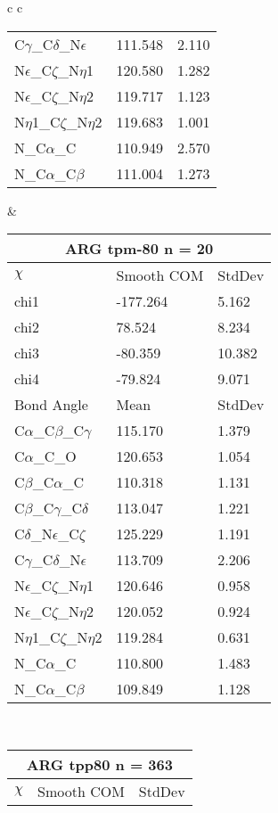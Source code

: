 \begin{longtable}{ c c }
\begin{tabular}{ l l l }
  C$\gamma$\_C$\delta$\_N$\epsilon$ & 111.548 & 2.110\\
  N$\epsilon$\_C$\zeta$\_N$\eta$1 & 120.580 & 1.282\\
  N$\epsilon$\_C$\zeta$\_N$\eta$2 & 119.717 & 1.123\\
  N$\eta$1\_C$\zeta$\_N$\eta$2 & 119.683 & 1.001\\
  N\_C$\alpha$\_C & 110.949 & 2.570\\
  N\_C$\alpha$\_C$\beta$ & 111.004 & 1.273\\
  \bottomrule
  \end{tabular}
  &
  \begin{tabular}{ l l l }
  \toprule
  \multicolumn{3}{c}{ARG \textbf{tpm-80} n = 20} \\ \toprule
  $\chi$       & Smooth COM & StdDev \\ \midrule
  chi1 & -177.264 & 5.162 \\ 
  chi2 & 78.524 & 8.234 \\ 
  chi3 & -80.359 & 10.382 \\ 
  chi4 & -79.824 & 9.071 \\ \midrule
  Bond Angle   & Mean     & StdDev \\ \midrule
  C$\alpha$\_C$\beta$\_C$\gamma$ & 115.170 & 1.379\\
  C$\alpha$\_C\_O & 120.653 & 1.054\\
  C$\beta$\_C$\alpha$\_C & 110.318 & 1.131\\
  C$\beta$\_C$\gamma$\_C$\delta$ & 113.047 & 1.221\\
  C$\delta$\_N$\epsilon$\_C$\zeta$ & 125.229 & 1.191\\
  C$\gamma$\_C$\delta$\_N$\epsilon$ & 113.709 & 2.206\\
  N$\epsilon$\_C$\zeta$\_N$\eta$1 & 120.646 & 0.958\\
  N$\epsilon$\_C$\zeta$\_N$\eta$2 & 120.052 & 0.924\\
  N$\eta$1\_C$\zeta$\_N$\eta$2 & 119.284 & 0.631\\
  N\_C$\alpha$\_C & 110.800 & 1.483\\
  N\_C$\alpha$\_C$\beta$ & 109.849 & 1.128\\
  \bottomrule
  \end{tabular}
  \\
  \begin{tabular}{ l l l }
  \toprule
  \multicolumn{3}{c}{ARG \textbf{tpp80} n = 363} \\ \toprule
  $\chi$       & Smooth COM & StdDev \\ \midrule

\end{tabular}
\end{longtable}
